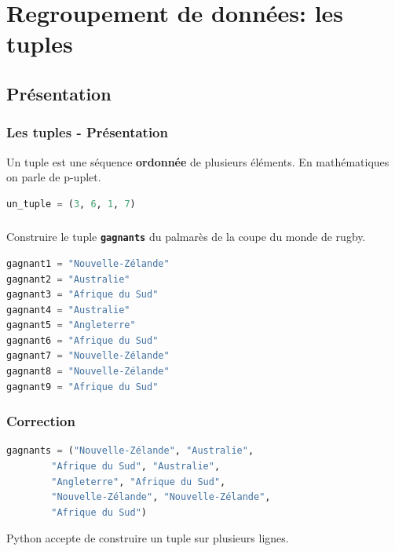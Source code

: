 \documentclass[svgnames,11pt]{beamer}
\begin{document}
\section{Regroupement de données: les tuples}
\subsection{Présentation}
\begin{frame}[fragile]
    \frametitle{Les tuples - Présentation}

    \begin{aretenir}[]
        Un tuple est une séquence \textbf{ordonnée} de plusieurs éléments. En mathématiques on parle de p-uplet.
    \end{aretenir}
\begin{center}
\begin{lstlisting}[language=Python , basicstyle=\ttfamily\small, xleftmargin=2em, xrightmargin=2em]
un_tuple = (3, 6, 1, 7)
\end{lstlisting}
\label{CODE}
\end{center}
\end{frame}
\begin{frame}[fragile]
    \frametitle{}

 \begin{activite}
 Construire le tuple \textbf{\texttt{gagnants}} du palmarès de la coupe du monde de rugby.
\begin{lstlisting}[language=Python , basicstyle=\ttfamily\small, xleftmargin=2em, xrightmargin=2em]
gagnant1 = "Nouvelle-Zélande"
gagnant2 = "Australie"
gagnant3 = "Afrique du Sud"
gagnant4 = "Australie"
gagnant5 = "Angleterre"
gagnant6 = "Afrique du Sud"
gagnant7 = "Nouvelle-Zélande"
gagnant8 = "Nouvelle-Zélande"
gagnant9 = "Afrique du Sud"
\end{lstlisting}
 \end{activite}   

\end{frame}
\begin{frame}[fragile]
    \frametitle{Correction}

    
\begin{lstlisting}[language=Python , basicstyle=\ttfamily\small, xleftmargin=0em, xrightmargin=0em]
gagnants = ("Nouvelle-Zélande", "Australie", 
        "Afrique du Sud", "Australie", 
        "Angleterre", "Afrique du Sud", 
        "Nouvelle-Zélande", "Nouvelle-Zélande", 
        "Afrique du Sud")
\end{lstlisting}
\begin{aretenir}[Commentaire]
Python accepte de construire un tuple sur plusieurs lignes.
\end{aretenir}
\end{frame}
\end{document}
